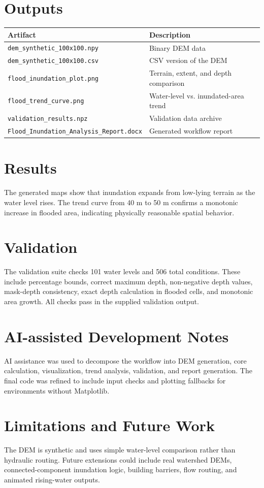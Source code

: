 \documentclass[11pt]{article}
\begin{document}
\section*{Outputs}
\begin{longtable}{ll}
\toprule
Artifact & Description \\
\midrule
\texttt{dem\_synthetic\_100x100.npy} & Binary DEM data \\
\texttt{dem\_synthetic\_100x100.csv} & CSV version of the DEM \\
\texttt{flood\_inundation\_plot.png} & Terrain, extent, and depth comparison \\
\texttt{flood\_trend\_curve.png} & Water-level vs. inundated-area trend \\
\texttt{validation\_results.npz} & Validation data archive \\
\texttt{Flood\_Inundation\_Analysis\_Report.docx} & Generated workflow report \\
\bottomrule
\end{longtable}

\section*{Results}
The generated maps show that inundation expands from low-lying terrain as the water level rises. The trend curve from 40 m to 50 m confirms a monotonic increase in flooded area, indicating physically reasonable spatial behavior.

\section*{Validation}
The validation suite checks 101 water levels and 506 total conditions. These include percentage bounds, correct maximum depth, non-negative depth values, mask-depth consistency, exact depth calculation in flooded cells, and monotonic area growth. All checks pass in the supplied validation output.

\section*{AI-assisted Development Notes}
AI assistance was used to decompose the workflow into DEM generation, core calculation, visualization, trend analysis, validation, and report generation. The final code was refined to include input checks and plotting fallbacks for environments without Matplotlib.

\section*{Limitations and Future Work}
The DEM is synthetic and uses simple water-level comparison rather than hydraulic routing. Future extensions could include real watershed DEMs, connected-component inundation logic, building barriers, flow routing, and animated rising-water outputs.
\end{document}
